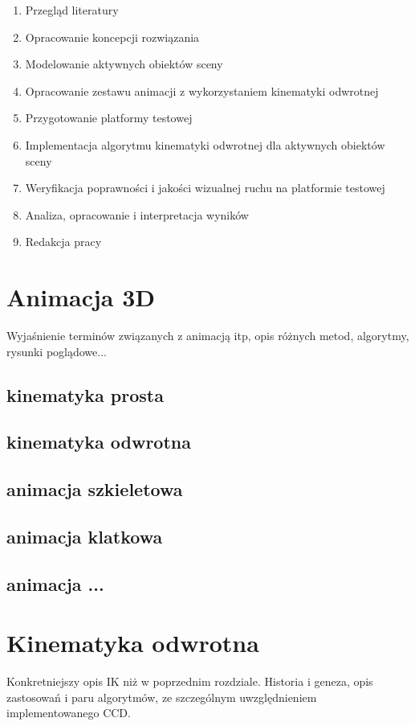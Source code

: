 \documentclass[11pt]{mwrep}
\begin{document}
\begin{enumerate}
\item Przegląd literatury
\item Opracowanie koncepcji rozwiązania
\item Modelowanie aktywnych obiektów sceny
\item Opracowanie zestawu animacji z wykorzystaniem kinematyki odwrotnej
\item Przygotowanie platformy testowej
\item Implementacja algorytmu kinematyki odwrotnej dla aktywnych obiektów sceny
\item Weryfikacja poprawności i jakości wizualnej ruchu na platformie testowej
\item Analiza, opracowanie i interpretacja wyników
\item Redakcja pracy
\end{enumerate}



\chapter{Animacja 3D}
Wyjaśnienie terminów związanych z animacją itp, opis różnych metod, algorytmy, rysunki poglądowe...
  \section{kinematyka prosta}
  \section{kinematyka odwrotna}
  \section{animacja szkieletowa}
  \section{animacja klatkowa}
  \section{animacja ...}
  
\chapter{Kinematyka odwrotna}
Konkretniejszy opis IK niż w poprzednim rozdziale. Historia i geneza, opis zastosowań i paru algorytmów, ze szczególnym uwzględnieniem implementowanego CCD.
\end{document}
